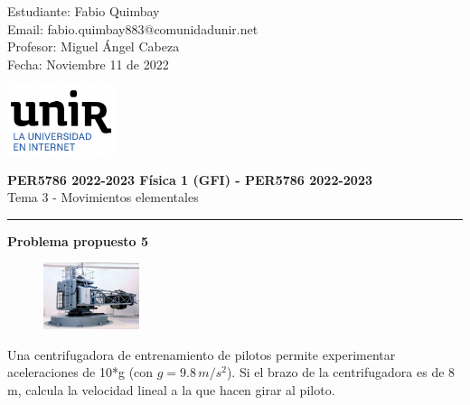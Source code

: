 \documentclass[11pt,letterpaper]{article}
\begin{document}
\pagestyle{plain}

\begin{flushleft}
Estudiante: Fabio Quimbay\\
Email: fabio.quimbay883@comunidadunir.net\\
Profesor: Miguel Ángel Cabeza\\
Fecha: Noviembre 11 de 2022\\
\end{flushleft}

\begin{flushright}\vspace{-20mm}
\includegraphics[height=2cm]{logo.png}
\end{flushright}
 
\begin{center}\vspace{0cm}
\textbf{\large PER5786 2022-2023  Física 1 (GFI) - PER5786 2022-2023}\\
 Tema 3 - Movimientos elementales
\end{center}

 
\rule{\linewidth}{0.1mm}

\bigskip
\bigskip

\textbf{Problema propuesto 5}\\

\begin{figure}
\begin{center}
\includegraphics[width=0.25\textwidth]{problema_5.png}
\end{center}
\end{figure}

Una centrifugadora de entrenamiento de pilotos permite experimentar aceleraciones de 10*g (con $g=9.8\,m/s^2$). Si el brazo de la centrifugadora es de 8 m, calcula la velocidad lineal a la que hacen girar al piloto.\\
\end{document}
